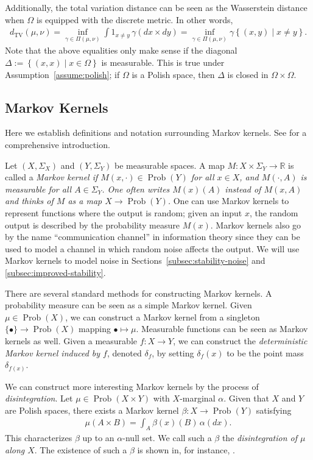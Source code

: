 \documentclass[twoside,11pt]{article}
\DeclareMathOperator{\prob}{Prob}
\newcommand{\set}[2]{\left\{ #1\middle| #2\right\}}
\newcommand{\TV}{d_{\mathrm{TV}}}
\begin{document}
Additionally, the total variation distance can be seen as the Wasserstein distance when $\Omega$ is equipped with the discrete metric. In other words,
\begin{align*}
    \TV(\mu,\nu) = \inf_{\gamma \in \Pi(\mu,\nu)} \int 1_{x\neq y} \, \gamma(dx{\times} dy)
    =
    \inf_{\gamma \in \Pi(\mu,\nu)} \gamma\set{(x,y)}{x\neq y}.
\end{align*}
Note that the above equalities only make sense if the diagonal $\Delta:=\set{(x,x)}{x\in \Omega}$ is measurable. This is true under Assumption~\ref{assume:polish}; if $\Omega$ is a Polish space, then $\Delta$ is closed in $\Omega \times \Omega$.

\subsection{Markov Kernels}\label{subsec:markov-kernels}
Here we establish definitions and notation surrounding Markov kernels. See \citet[Ch 14.2]{klenke_probability_2014} for a comprehensive introduction.

Let $(X, \Sigma_X)$ and $(Y,\Sigma_Y)$ be measurable spaces. A map $M:X\times \Sigma_Y \to \mathbb R$ is called a \emph{Markov kernel if $M(x,\cdot)\in \prob(Y)$ for all $x\in X$, and $M(\cdot,A)$ is measurable for all $A\in \Sigma_Y$. One often writes $M(x)(A)$ instead of $M(x,A)$ and thinks of $M$ as a map $X\to \prob(Y)$.} One can use Markov kernels to represent functions where the output is random; given an input $x$, the random output is described by the probability measure $M(x)$. Markov kernels also go by the name ``communication channel'' in information theory since they can be used to model a channel in which random noise affects the output. We will use Markov kernels to model noise in Sections~\ref{subsec:stability-noise} and \ref{subsec:improved-stability}.




There are several standard methods for constructing Markov kernels. A probability measure can be seen as a simple Markov kernel. Given $\mu \in \prob(X)$, we can construct a Markov kernel from a singleton  $\{\bullet\}\to \prob(X)$ mapping $\bullet \mapsto \mu$. Measurable functions can be seen as Markov kernels as well. Given a measurable $f:X\to Y$, we can construct the \emph{deterministic Markov kernel induced by $f$}, denoted $\delta_f$, by setting $\delta_f(x)$ to be the point mass $\delta_{f(x)}$.

We can construct more interesting Markov kernels by the process of \emph{disintegration}. Let $\mu \in \prob(X\times Y)$ with $X$-marginal $\alpha$. Given that $X$ and $Y$ are Polish spaces, there exists a Markov kernel $\beta:X\to \prob(Y)$ satisfying
\begin{align}
    \mu(A\times B) = \int_A \beta(x)(B) \, \alpha(dx).\label{eq:disintegration}
\end{align}
This characterizes $\beta$ up to an $\alpha$-null set. We call such a $\beta$ the \emph{disintegration of $\mu$ along $X$}. The existence of such a $\beta$ is shown in, for instance,  \citep[Theorem~10.4.8]{bogachev_measure_2007}.
\end{document}
